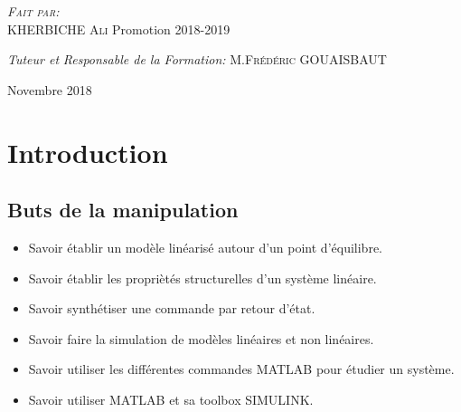 \documentclass[12pt, a4paper, openany]{report}
\begin{document}
\begin{titlepage}
\begin{sffamily}
\begin{center}
    \begin{minipage}{0.4\textwidth}
      \begin{flushleft} \large
         \textsc{\emph {Fait par:} \\KHERBICHE Ali}  
          \newline
          Promotion 2018-2019 \\
      \end{flushleft}
    \end{minipage}
    \begin{minipage}{0.4\textwidth}
      \begin{flushright} \large
        \emph{Tuteur et}
        \emph{Responsable de la Formation:} \textsc{M.Frédéric GOUAISBAUT}
      \end{flushright}
    \end{minipage}

    \vfill

    {\large Novembre 2018}

  \end{center}
  \end{sffamily}      
          
  \end{titlepage}
  
\makeatother




   
\renewcommand{\contentsname}{Sommaire}
\tableofcontents
\listoffigures
\listoftables



\chapter*{Introduction}

	\section*{Buts de la manipulation}
	
		 \begin{itemize} [label=,font=\small \color{black}]
		 	\item Savoir établir un modèle linéarisé autour d'un point d'équilibre.
		 	\item Savoir établir les propriètés structurelles d'un système linéaire.
		 	\item Savoir synthétiser une commande par retour d'état.
 		 	\item Savoir faire la simulation de modèles linéaires et non linéaires.
		 	\item Savoir utiliser les différentes commandes MATLAB pour étudier un système.
			\item Savoir utiliser MATLAB et sa toolbox SIMULINK.	 	
		\end{itemize}
		
\end{document}
